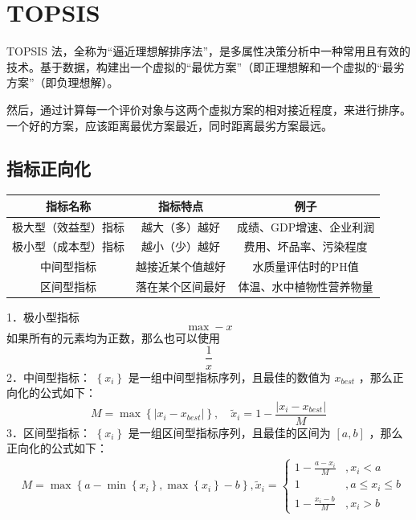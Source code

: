 \section{TOPSIS}

\begin{definition}[TOPSIS]
    TOPSIS 法，全称为“逼近理想解排序法”，是多属性决策分析中一种常用且有效的技术。基于数据，构建出一个虚拟的“最优方案”（即正理想解和一个虚拟的“最劣方案”（即负理想解）。

    然后，通过计算每一个评价对象与这两个虚拟方案的相对接近程度，来进行排序。一个好的方案，应该距离最优方案最近，同时距离最劣方案最远。
\end{definition}

\subsection{指标正向化}

\begin{center}
    \begin{tabular}{|c|c|c|}
        \hline 指标名称       & 指标特点     & 例子            \\
        \hline 极大型（效益型）指标 & 越大（多）越好  & 成绩、GDP增速、企业利润 \\
        \hline 极小型（成本型）指标 & 越小（少）越好  & 费用、坏品率、污染程度   \\
        \hline 中间型指标      & 越接近某个值越好 & 水质量评估时的PH值    \\
        \hline 区间型指标      & 落在某个区间最好 & 体温、水中植物性营养物量  \\
        \hline
    \end{tabular}
\end{center}

\begin{theorem}[指标正向化]
    1．极小型指标
    $$
        \max -x
    $$
    如果所有的元素均为正数，那么也可以使用
    $$
        \frac{1}{x}
    $$
    2．中间型指标：
    $\left\{x_i\right\}$ 是一组中间型指标序列，且最佳的数值为 $x_{b e s t}$ ，那么正向化的公式如下：
    $$
        M=\max \left\{\left|x_i-x_{b e s t}\right|\right\}, \quad \tilde{x}_i=1-\frac{\left|x_i-x_{b e s t}\right|}{M}
    $$
    3．区间型指标：
    $\left\{x_i\right\}$ 是一组区间型指标序列，且最佳的区间为 $[a, b]$ ，那么正向化的公式如下：
    $$
        \begin{aligned}
             & M=\max \left\{a-\min \left\{x_i\right\}, \max \left\{x_i\right\}-b\right\}, \tilde{x}_i= \begin{cases}1-\frac{a-x_i}{M} & , x_i<a             \\
             1                 & , a \leq x_i \leq b \\
             1-\frac{x_i-b}{M} & , x_i>b\end{cases}
        \end{aligned}
    $$
\end{theorem}

